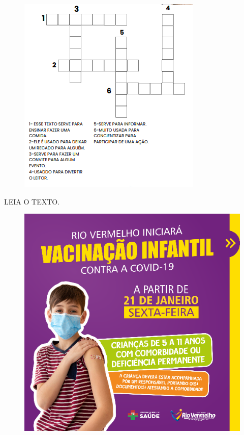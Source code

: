 \begin{figure}[htpb!]
\centering
\includegraphics[width=.7\textwidth]{media/image155.png}
\end{figure}


\pagebreak
LEIA O TEXTO.

\begin{figure}[htpb!]
\centering
\includegraphics[width=\textwidth]{media/image156.png}
\end{figure}

